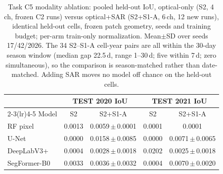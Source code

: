 \begin{table}[t]
\centering
\small
\caption{Task C5 modality ablation: pooled held-out IoU, optical-only
(S2, 4\,ch, frozen C2 runs) versus optical+SAR (S2+S1-A, 6\,ch, 12 new
runs), identical held-out cells, frozen patch geometry, seeds and
training budget; per-arm train-only normalization. Mean$\pm$SD over
seeds 17/42/2026. The 34 S2--S1-A cell-year pairs are all within the
30-day season window (median gap 22.5\,d, range 1--30\,d; five within
7\,d; zero simultaneous), so the comparison is season-matched rather
than date-matched. Adding SAR moves no model off chance on the held-out
cells.}
\label{tab:silverc5}
\begin{tabular}{lcccc}
\toprule
& \multicolumn{2}{c}{TEST 2020 IoU} & \multicolumn{2}{c}{TEST 2021 IoU} \\
\cmidrule(lr){2-3}\cmidrule(lr){4-5}
Model & S2 & S2+S1-A & S2 & S2+S1-A \\
\midrule
RF pixel      & 0.0013 & 0.0059\,$\pm$\,0.0001 & 0.0001 & 0.0001 \\
U-Net         & 0.0000 & 0.0158\,$\pm$\,0.0085 & 0.0000 & 0.0071\,$\pm$\,0.0065 \\
DeepLabV3+    & 0.0004 & 0.0028\,$\pm$\,0.0018 & 0.0202 & 0.0025\,$\pm$\,0.0018 \\
SegFormer-B0  & 0.0033 & 0.0036\,$\pm$\,0.0032 & 0.0004 & 0.0070\,$\pm$\,0.0020 \\
\bottomrule
\end{tabular}
\end{table}
